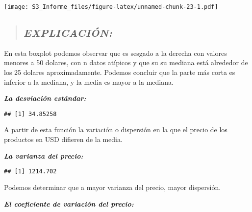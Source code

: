 \documentclass[
]{article}
\newenvironment{Shaded}{\begin{snugshade}}{\end{snugshade}}
\newcommand{\AttributeTok}[1]{\textcolor[rgb]{0.77,0.63,0.00}{#1}}
\newcommand{\CommentTok}[1]{\textcolor[rgb]{0.56,0.35,0.01}{\textit{#1}}}
\newcommand{\ConstantTok}[1]{\textcolor[rgb]{0.00,0.00,0.00}{#1}}
\newcommand{\ControlFlowTok}[1]{\textcolor[rgb]{0.13,0.29,0.53}{\textbf{#1}}}
\newcommand{\FunctionTok}[1]{\textcolor[rgb]{0.00,0.00,0.00}{#1}}
\newcommand{\NormalTok}[1]{#1}
\newcommand{\OtherTok}[1]{\textcolor[rgb]{0.56,0.35,0.01}{#1}}
\newcommand{\SpecialCharTok}[1]{\textcolor[rgb]{0.00,0.00,0.00}{#1}}
\begin{document}
\texttt{[image: S3\_Informe\_files/figure-latex/unnamed-chunk-23-1.pdf]}

\begin{quote}
\hypertarget{explicaciuxf3n-5}{%
\subsection{\texorpdfstring{\textbf{\emph{EXPLICACIÓN:}}}{EXPLICACIÓN:}}\label{explicaciuxf3n-5}}
\end{quote}

En esta boxplot podemos observar que es sesgado a la derecha con valores
menores a 50 dolares, con n datos atípicos y que su su mediana está
alrededor de los 25 dolares aproximadamente. Podemos concluir que la
parte más corta es inferior a la mediana, y la media es mayor a la
mediana.

\textbf{\emph{La desviación estándar:}}

\begin{Shaded}
\end{Shaded}

\begin{verbatim}
## [1] 34.85258
\end{verbatim}

A partir de esta función la variación o dispersión en la que el precio
de los productos en USD difieren de la media.

\textbf{\emph{La varianza del precio:}}

\begin{Shaded}
\end{Shaded}

\begin{verbatim}
## [1] 1214.702
\end{verbatim}

Podemos determinar que a mayor varianza del precio, mayor dispersión.

\textbf{\emph{El coeficiente de variación del precio:}}

\begin{Shaded}
\end{Shaded}
\end{document}
